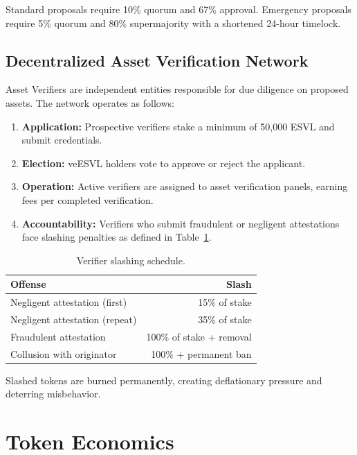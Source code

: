 \documentclass[11pt,a4paper]{article}
\begin{document}
Standard proposals require 10\% quorum and 67\% approval. Emergency proposals require 5\% quorum and 80\% supermajority with a shortened 24-hour timelock.

\subsection{Decentralized Asset Verification Network}

Asset Verifiers are independent entities responsible for due diligence on proposed assets. The network operates as follows:

\begin{enumerate}[nosep]
    \item \textbf{Application:} Prospective verifiers stake a minimum of 50,000 ESVL and submit credentials.
    \item \textbf{Election:} veESVL holders vote to approve or reject the applicant.
    \item \textbf{Operation:} Active verifiers are assigned to asset verification panels, earning fees per completed verification.
    \item \textbf{Accountability:} Verifiers who submit fraudulent or negligent attestations face slashing penalties as defined in Table~\ref{tab:slashing}.
\end{enumerate}

\begin{table}[H]
\centering
\caption{Verifier slashing schedule.}
\label{tab:slashing}
\begin{tabular}{lr}
\toprule
\textbf{Offense} & \textbf{Slash} \\
\midrule
Negligent attestation (first) & 15\% of stake \\
Negligent attestation (repeat) & 35\% of stake \\
Fraudulent attestation & 100\% of stake + removal \\
Collusion with originator & 100\% + permanent ban \\
\bottomrule
\end{tabular}
\end{table}

Slashed tokens are burned permanently, creating deflationary pressure and deterring misbehavior.

\section{Token Economics}
\label{sec:tokenomics}
\end{document}
